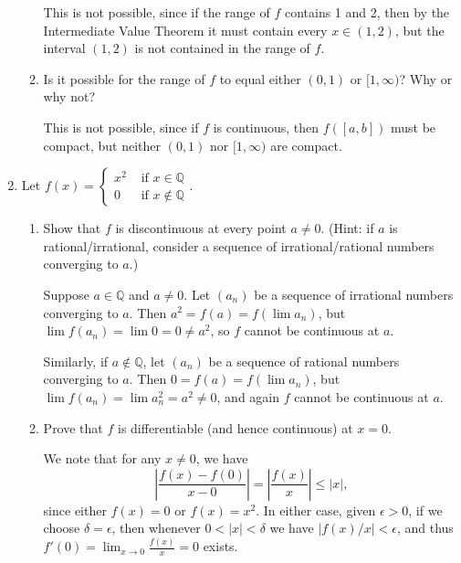 \documentclass[12pt]{article}
\newcommand{\points}[1]{\marginpar{\hspace{24pt}[#1]}}
\newcommand{\Q}{\mathbb{Q}}
\newcommand{\abs}[1]{\lvert #1\rvert}
\newcommand{\Abs}[1]{\left| #1 \right|}
\begin{document}
\begin{enumerate}
\begin{enumerate}
\bigskip

This is not possible, since if the range of $f$ contains 1 and 2, then by the Intermediate Value Theorem it must contain every $x\in (1,2)$, but the interval $(1,2)$ is not contained in the range of $f$.

\bigskip

 \item Is it possible for the range of $f$ to equal either $(0,1)$ or $[1,\infty)$? Why or why not? \points{2}
 
 \bigskip
 
 This is not possible, since if $f$ is continuous, then $f([a,b])$ must be compact, but neither $(0,1)$ nor $[1,\infty)$ are compact.
\end{enumerate}
\newpage

\item Let $f(x)=\begin{cases} x^2 & \text{ if } x\in\Q\\ 0 & \text{ if } x\notin\Q\end{cases}$.
\begin{enumerate}
 \item Show that $f$ is discontinuous at every point $a\neq 0$.\points{4} (Hint: if $a$ is rational/irrational, consider a sequence of irrational/rational numbers converging to $a$.)

\bigskip

Suppose $a\in \Q$ and $a\neq 0$. Let $(a_n)$ be a sequence of irrational numbers converging to $a$. Then $a^2=f(a) = f(\lim a_n)$, but $\lim f(a_n) = \lim 0 =0\neq a^2$, so $f$ cannot be continuous at $a$.

Similarly, if $a\notin \Q$, let $(a_n)$ be a sequence of rational numbers converging to $a$. Then $0=f(a)=f(\lim a_n)$, but $\lim f(a_n) = \lim a_n^2 = a^2\neq 0$, and again $f$ cannot be continuous at $a$.

\bigskip

 \item Prove that $f$ is differentiable (and hence continuous) at $x=0$. \points{4}

\bigskip

We note that for any $x\neq 0$, we have
\[
\Abs{\frac{f(x)-f(0)}{x-0}} = \Abs{\frac{f(x)}{x}}\leq \abs{x},
\]
since either $f(x)=0$ or $f(x)=x^2$. In either case, given $\epsilon>0$, if we choose $\delta=\epsilon$, then whenever $0<\abs{x}<\delta$ we have $\abs{f(x)/x}<\epsilon$, and thus $\displaystyle f'(0) = \lim_{x\to 0}\frac{f(x)}{x} = 0$ exists.



\end{enumerate}
\end{enumerate}
\end{document}
